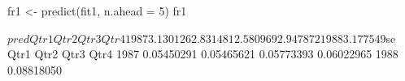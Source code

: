\begin{Schunk}
\begin{Sinput}
 fr1 <- predict(fit1, n.ahead = 5)
 fr1
\end{Sinput}
\begin{Soutput}
$pred
         Qtr1     Qtr2     Qtr3     Qtr4
1987 3.130126 2.831481 2.580969 2.947872
1988 3.177549                           

$se
           Qtr1       Qtr2       Qtr3       Qtr4
1987 0.05450291 0.05465621 0.05773393 0.06022965
1988 0.08818050                                 
\end{Soutput}
\end{Schunk}
